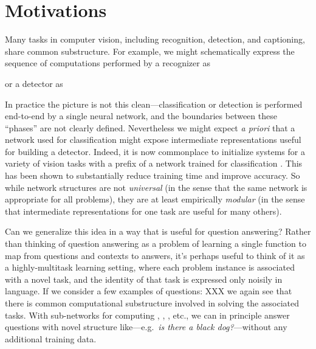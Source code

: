 \documentclass[10pt,twocolumn,letterpaper]{article}
\begin{document}
\section{Motivations}

Many tasks in computer vision, including recognition, detection, and captioning,
share common substructure. For example, we might schematically express the
sequence of computations performed by a recognizer as
\begin{flushleft}
\end{flushleft}
or a detector as
\begin{flushleft}
\end{flushleft}

In practice the picture is not this clean---classification or detection is
performed end-to-end by a single neural network, and the boundaries between
these ``phases'' are not clearly defined. Nevertheless we might expect \textit{a
priori} that a network used for classification might expose intermediate
representations useful for building a detector. Indeed, it is now commonplace to
initialize systems for a variety of vision tasks with a prefix of a network
trained for classification \cite{Long14FullyConvolutional}. This has been shown
to substantially reduce training time and improve accuracy. So while network
structures are not \emph{universal} (in the sense that the same network is
appropriate for all problems), they are at least empirically \emph{modular} (in
the sense that intermediate representations for one task are useful for many
others). 

Can we generalize this idea in a way that is useful for question answering?
Rather than thinking of question answering as a problem of learning a single
function to map from questions and contexts to answers, it's perhaps useful to
think of it as a highly-multitask learning setting, where each problem instance
is associated with a novel task, and the identity of that task is expressed only
noisily in language. If we consider a few examples of questions:
XXX
we again see that there is common computational substructure involved in solving
the associated tasks.  With sub-networks for computing ,
, , etc., we can in principle answer
questions with novel structure like---e.g.\ {\it is there a black
dog?}---without any additional training data.
\end{document}
